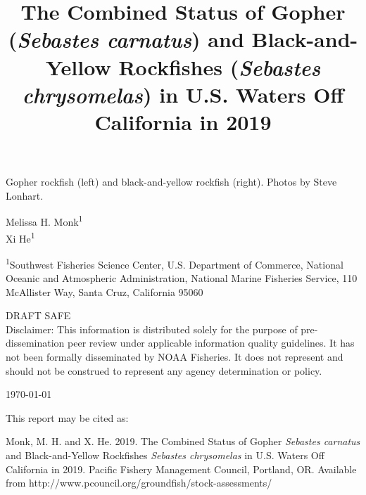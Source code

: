 \documentclass[12pt,]{article}
\title{The Combined Status of Gopher (\emph{Sebastes carnatus}) and
Black-and-Yellow Rockfishes (\emph{Sebastes chrysomelas}) in U.S. Waters
Off California in 2019}
\author{}
\date{}
\begin{document}
\maketitle


\begin{center}
\thispagestyle{empty}


\vspace{.5cm}

Gopher rockfish (left) and black-and-yellow rockfish (right).      
\small
Photos by Steve Lonhart.

\vspace{.3cm}


Melissa H. Monk\textsuperscript{1}\\
Xi He\textsuperscript{1}\\

\vspace{.5cm}

\small
\textsuperscript{1}Southwest Fisheries Science Center, U.S. Department of Commerce, National Oceanic and Atmospheric Administration, National Marine Fisheries Service, 110 McAllister Way, Santa Cruz, California 95060\\

\vspace{1.5cm}


DRAFT SAFE\\
Disclaimer: This information is distributed solely for the purpose of pre-dissemination
peer review under applicable information quality guidelines. It has not been formally
disseminated by NOAA Fisheries. It does not represent and should not be construed to
represent any agency determination or policy. 

\vspace{.1cm}
{\large \today}


\newpage{\thispagestyle{empty}}


\begin{flushleft}
This report may be cited as:

Monk, M. H.  and X. He. 2019. The Combined Status of Gopher \emph{Sebastes carnatus} and Black-and-Yellow Rockfishes \emph{Sebastes chrysomelas} in U.S. Waters Off California in 2019. Pacific Fishery Management Council, Portland, OR. Available from http://www.pcouncil.org/groundfish/stock-assessments/
\end{flushleft}

\maketitle

\setcounter{page}{1}
\end{center}
\end{document}
